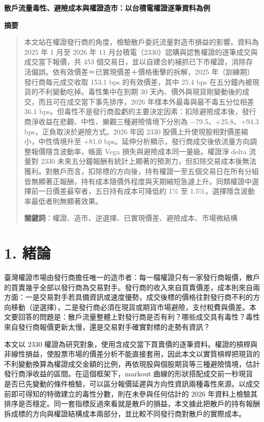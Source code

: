 \documentclass[12pt,a4paper]{article}
\begin{document}
\begin{center}{\LARGE\bfseries 散戶流量毒性、避險成本與權證造市：以台積電權證逐筆資料為例}\end{center}\vspace{1em}

\begin{center}\textbf{摘要}\end{center}\begin{quote}\small
本文站在權證發行商的角度，檢驗散戶委託流量對造市損益的影響。資料為 2025 年 1 月至 2026 年 11 月台積電（2330）認購與認售權證的逐筆成交與成交當下報價，共 453 個交易日，並以自建合約補抓已下市權證，消除存活偏誤。依有效價差＝已實現價差＋價格衝擊的拆解，2025 年（訓練期）發行商每元成交收取 153.1 bps 的有效價差，其中 25.4 bps 在五分鐘內被現貨的不利變動吃掉。毒性集中在到期 30 天內、價外與現貨剛變動後的成交，而且可在成交當下事先排序，2026 年樣本外最毒與最不毒五分位相差 36.1 bps。但毒性不是發行商盈虧的主要決定因素：扣除避險成本後，發行商淨收益在悲觀、中性、樂觀三種避險情境下分別為 −79.5、+25.8、+94.3 bps，正負取決於避險方式。2026 年因 2330 股價上升使現股相對價差縮小，中性情境升至 +81.0 bps。延伸分析顯示，發行商成交後依流量方向調整報價隱含波動率，帳面 Vega 損失與避險成本同一量級。權證淨 delta 流量對 2330 未來五分鐘報酬有統計上顯著的預測力，但扣除交易成本後無法獲利。對散戶而言，扣除標的方向後，持有權證一至五個交易日在所有分組皆無顯著正報酬，持有成本隨價外程度與天期縮短急遽上升。同類權證中選擇前一日價差最窄者，五日持有成本可降低約 1\% 至 1.5\%，選擇隱含波動率最低者則無顯著效果。

\textbf{關鍵詞}：權證、造市、逆選擇、已實現價差、避險成本、市場微結構

\end{quote}

\section*{1. 緒論}

臺灣權證市場由發行商擔任唯一的造市者：每一檔權證只有一家發行商報價，散戶的買賣幾乎全部以發行商為交易對手。發行商的收入來自買賣價差，成本則來自兩方面：一是交易對手若具備資訊或速度優勢，成交後標的價格往對發行商不利的方向移動（逆選擇），二是發行商必須在現貨或期貨市場避險，支付稅費與價差。本文要回答的問題是：散戶流量整體上對發行商是否有利？哪些成交具有毒性？毒性來自發行商報價更新太慢，還是交易對手確實對標的走勢有資訊？

本文以 2330 權證為研究對象，使用含成交當下買賣價的逐筆資料。權證的槓桿與非線性損益，使股票市場的價差分析不能直接套用，因此本文以實質槓桿把現貨的不利變動換算為權證成交金額的比例，再依現股與個股期貨等三種避險情境，估計發行商淨收益的區間。在這個框架下，markout 曲線的形狀搭配成交前一秒現貨是否已先變動的條件檢驗，可以區分報價延遲與方向性資訊兩種毒性來源。以成交前即可得知的特徵建立的毒性分數，則在未參與任何估計的 2026 年資料上檢驗其排序是否穩定。同一套指標反過來看就是散戶的損益，本文據此把散戶的持有報酬拆成標的方向與權證結構成本兩部分，並比較不同發行商對散戶的實際成本。
\end{document}
